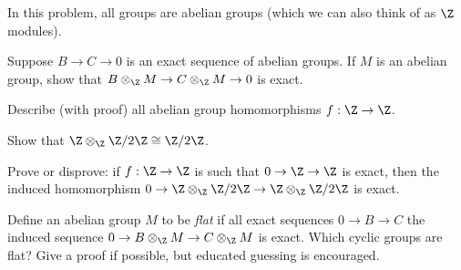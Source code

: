In this problem, all groups are abelian groups (which we can also
think of as $\Z$ modules).
\begin{alist}
\item Suppose $B\rightarrow C\rightarrow 0$ is an exact sequence of
abelian groups. If $M$ is an abelian group, show that $B \otimes_{\Z}
M\rightarrow C \otimes_{\Z}M\rightarrow 0$ is exact.
\item Describe (with proof) all abelian group homomorphisms
$f:\Z\rightarrow \Z$.
\item Show that $\Z\otimes_{\Z}\Z/2\Z\cong \Z/2\Z$.
\item Prove or disprove: if $f:\Z\rightarrow \Z$ is such that
$0\rightarrow \Z\rightarrow \Z$ is exact, then the induced
homomorphism $0\rightarrow \Z\otimes_{\Z}\Z/2\Z\rightarrow
\Z\otimes_{\Z}\Z/2\Z$ is exact.
\item Define an abelian group $M$ to be \emph{flat} if all exact sequences
$0\rightarrow B\rightarrow C$ the induced sequence $0\rightarrow
B\otimes_{\Z}M\rightarrow C\otimes_{\Z}M$ is exact.  Which cyclic
groups are flat? Give a proof if possible, but educated guessing is
encouraged.
\end{alist}
